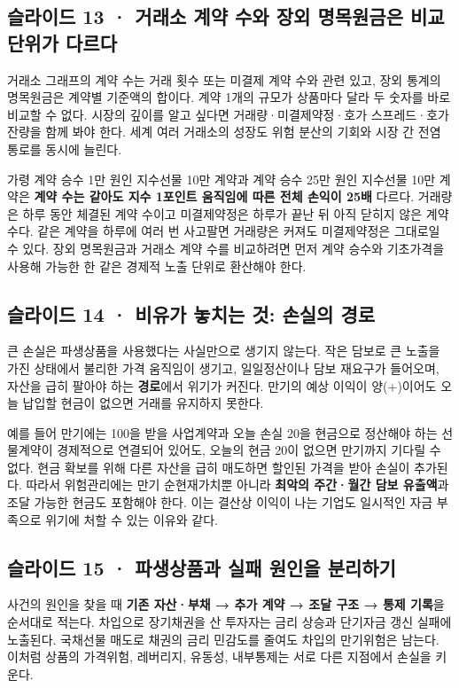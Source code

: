 \documentclass[11pt,a4paper]{article}
\begin{document}
\subsection{슬라이드 13 · 거래소 계약 수와 장외 명목원금은 비교 단위가 다르다}
거래소 그래프의 계약 수는 거래 횟수 또는 미결제 계약 수와 관련 있고, 장외 통계의 명목원금은 계약별 기준액의 합이다. 계약 1개의 규모가 상품마다 달라 두 숫자를 바로 비교할 수 없다. 시장의 깊이를 알고 싶다면 거래량·미결제약정·호가 스프레드·호가 잔량을 함께 봐야 한다. 세계 여러 거래소의 성장도 위험 분산의 기회와 시장 간 전염 통로를 동시에 늘린다.\par

가령 계약 승수 1만 원인 지수선물 10만 계약과 계약 승수 25만 원인 지수선물 10만 계약은 \textbf{계약 수는 같아도 지수 1포인트 움직임에 따른 전체 손익이 25배} 다르다. 거래량은 하루 동안 체결된 계약 수이고 미결제약정은 하루가 끝난 뒤 아직 닫히지 않은 계약 수다. 같은 계약을 하루에 여러 번 사고팔면 거래량은 커져도 미결제약정은 그대로일 수 있다. 장외 명목원금과 거래소 계약 수를 비교하려면 먼저 계약 승수와 기초가격을 사용해 가능한 한 같은 경제적 노출 단위로 환산해야 한다.\par

\subsection{슬라이드 14 · 비유가 놓치는 것: 손실의 경로}
큰 손실은 파생상품을 사용했다는 사실만으로 생기지 않는다. 작은 담보로 큰 노출을 가진 상태에서 불리한 가격 움직임이 생기고, 일일정산이나 담보 재요구가 들어오며, 자산을 급히 팔아야 하는 \textbf{경로}에서 위기가 커진다. 만기의 예상 이익이 양(+)이어도 오늘 납입할 현금이 없으면 거래를 유지하지 못한다.\par

예를 들어 만기에는 100을 받을 사업계약과 오늘 손실 20을 현금으로 정산해야 하는 선물계약이 경제적으로 연결되어 있어도, 오늘의 현금 20이 없으면 만기까지 기다릴 수 없다. 현금 확보를 위해 다른 자산을 급히 매도하면 할인된 가격을 받아 손실이 추가된다. 따라서 위험관리에는 만기 순현재가치뿐 아니라 \textbf{최악의 주간·월간 담보 유출액}과 조달 가능한 현금도 포함해야 한다. 이는 결산상 이익이 나는 기업도 일시적인 자금 부족으로 위기에 처할 수 있는 이유와 같다.\par

\subsection{슬라이드 15 · 파생상품과 실패 원인을 분리하기}
사건의 원인을 찾을 때 \textbf{기존 자산·부채 → 추가 계약 → 조달 구조 → 통제 기록}을 순서대로 적는다. 차입으로 장기채권을 산 투자자는 금리 상승과 단기자금 갱신 실패에 노출된다. 국채선물 매도로 채권의 금리 민감도를 줄여도 차입의 만기위험은 남는다. 이처럼 상품의 가격위험, 레버리지, 유동성, 내부통제는 서로 다른 지점에서 손실을 키운다.\par
\end{document}
